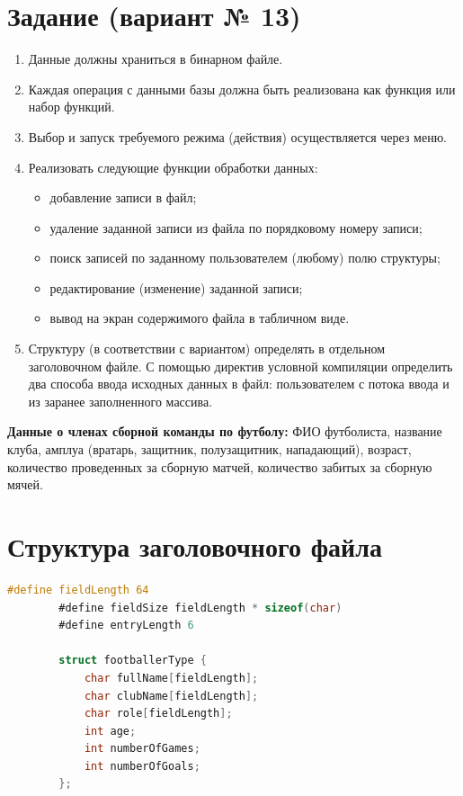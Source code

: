 \documentclass[12pt]{article}
\begin{document}
	\newpage
	
	
	\section{Задание (вариант № 13)}
	
	\begin{enumerate}
		\item Данные должны храниться в бинарном файле.
		\item Каждая операция с данными базы должна быть реализована как функция или набор функций.
		\item Выбор и запуск требуемого режима (действия) осуществляется через меню.
		\item Реализовать следующие функции обработки данных:
		\begin{itemize}
			\item добавление записи в файл;
			\item удаление заданной записи из файла по порядковому номеру записи;
			\item поиск записей по заданному пользователем (любому) полю структуры;
			\item редактирование (изменение) заданной записи;
			\item вывод на экран содержимого файла в табличном виде.
		\end{itemize}
		\item Структуру (в соответствии с вариантом) определять в отдельном заголовочном файле. С
		помощью директив условной компиляции определить два способа ввода исходных данных в
		файл: пользователем с потока ввода и из заранее заполненного массива.
	\end{enumerate}
	\textbf{Данные о членах сборной команды по футболу:} ФИО футболиста, название клуба, амплуа (вратарь, защитник, полузащитник, нападающий), возраст, количество проведенных за сборную матчей, количество забитых за сборную мячей.
	
	\newpage
	
	\section{Структура заголовочного файла}
	
	\begin{lstlisting}[language=C]
		#define fieldLength 64
		#define fieldSize fieldLength * sizeof(char)
		#define entryLength 6
		
		struct footballerType {
			char fullName[fieldLength];
			char clubName[fieldLength];
			char role[fieldLength];
			int age;
			int numberOfGames;
			int numberOfGoals;
		};
	\end{lstlisting}
	
\end{document}
